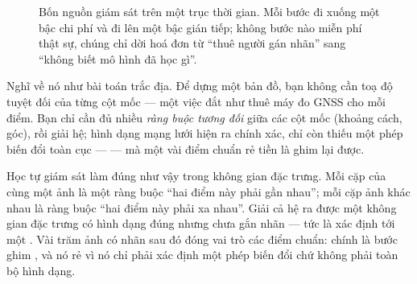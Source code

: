 \documentclass[../../../deep_learning.tex]{subfiles}
\begin{document}
\begin{figure}[H]\centering
{}
\caption{Bốn nguồn giám sát trên một trục thời gian. Mỗi bước đi xuống một bậc chi phí và đi lên một bậc gián tiếp; không bước nào miễn phí thật sự, chúng chỉ dời hoá đơn từ ``thuê người gán nhãn'' sang ``không biết mô hình đã học gì''.}
\label{fig:dong-thoi-gian-giam-sat}
\end{figure}

\begin{trucgiac}
Nghĩ về nó như bài toán trắc địa. Để dựng một bản đồ, bạn không cần toạ độ tuyệt đối của từng cột mốc --- một việc đắt như thuê máy đo GNSS cho mỗi điểm. Bạn chỉ cần đủ nhiều \emph{ràng buộc tương đối} giữa các cột mốc (khoảng cách, góc), rồi giải hệ; hình dạng mạng lưới hiện ra chính xác, chỉ còn thiếu một phép biến đổi toàn cục ---  --- mà một vài điểm chuẩn rẻ tiền là ghim lại được.

Học tự giám sát làm đúng như vậy trong không gian đặc trưng. Mỗi cặp  của cùng một ảnh là một ràng buộc ``hai điểm này phải gần nhau''; mỗi cặp ảnh khác nhau là ràng buộc ``hai điểm này phải xa nhau''. Giải cả hệ ra được một không gian đặc trưng có hình dạng đúng nhưng chưa gắn nhãn --- tức là xác định tới một . Vài trăm ảnh có nhãn sau đó đóng vai trò các điểm chuẩn:  chính là bước ghim , và nó rẻ vì nó chỉ phải xác định một phép biến đổi chứ không phải toàn bộ hình dạng.
\end{trucgiac}
\end{document}
